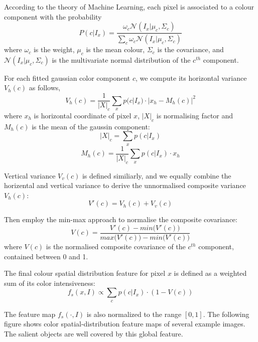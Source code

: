 \documentclass[10pt,twocolumn,letterpaper]{article}
\newcommand{\SUM}{\sum\limits}
\begin{document}
    According to the theory of Machine Learning, each pixel is associated to a colour component with the probability
    $$
    P(c|I_x) = \frac{\omega_c\mathcal{N}(I_x|\mu_c,\Sigma_c)}{\SUM_c \omega_c \mathcal{N}(I_x|\mu_c,\Sigma_c)}
    $$
    where $\omega_c$ is the weight, $\mu_c$ is the mean colour, $\Sigma_c$ is the covariance, and $\mathcal N(I_x|\mu_c,\Sigma_c)$ is the multivariate normal distribution of the $c^{th}$ component.

    For each fitted gaussian color component $c$, we compute its horizontal variance $V_{h}(c)$ as follows,
    $$
    V_{h}(c) = \frac{1}{|X|_{c}} \sum_{x} p (c|I_{x}) \cdot | x_{h} - M_{h}(c) |^{2}
    $$
    where $x_h$ is horizontal coordinate of pixel $x$, $|X|_c$ is normalising factor 
    and $M_h (c)$ is the mean of the gaussin component:
    $$
    |X|_c = \sum_x p(c|I_x)
    $$
    $$
    M_h (c) = \frac{1}{|X|_c} \sum_{x} p(c|I_x) \cdot x_h
    $$

    Vertical variance $V_{v}(c)$ is defined similiarly, and we equally combine the horizental and vertical variance to derive the unnormalised composite variance $V_h (c)$: 
    $$
    V' (c) = V_h (c) + V_v (c) 
    $$

    Then employ the min-max approach to normalise the composite covariance:
    $$
    V (c) = \frac{V'(c) - min \big(V'(c)\big) }{max \big(V'(c)\big) - min \big(V'(c)\big)}  
    $$
    where $V(c)$ is the normalised composite covariance of the $c^{th}$ component, contained between 0 and 1.

    The final colour spatial distribution feature for pixel $x$ is defined as a weighted sum of its color intensiveness:
    $$
    f_s(x,I)\propto\SUM_c p(c|I_x)\cdot(1-V(c))
    $$

    The feature map $f_s (\cdot,I)$ is also normalized to the range $[0, 1]$. The following figure
    shows color spatial-distribution feature maps of several example images. 
    The salient objects are well covered by this global feature. 
\end{document}
